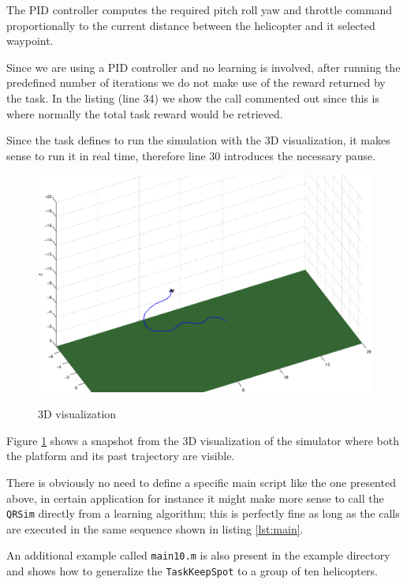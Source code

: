 \documentclass[a4paper,11pt]{report}
\newcommand{\snamettt}{\texttt{QRSim}\xspace}
\begin{document}
The PID controller computes the required pitch roll yaw and throttle command proportionally to the current distance between the helicopter and it selected waypoint.

Since we are using a PID controller and no learning is involved, after running the predefined number of iterations we do not make use of the reward returned by the task. In the listing (line 34) we show the call commented out since this is where normally the total task reward would be retrieved.

Since the task defines to run the simulation with the 3D visualization, it makes sense to run it in real time, therefore line 30 introduces the necessary pause.  

\begin{figure}
\begin{center}
\label{fig:3d}
\includegraphics[width=13cm]{./3d.eps}
 \caption{3D visualization}
\end{center}
\end{figure}

Figure \ref{fig:3d} shows a snapshot from the 3D visualization of the simulator where both the platform and its past trajectory are visible.

There is obviously no need to define a specific main script like the one presented above, in certain application for instance it might make more sense to call the \snamettt directly from  a learning algorithm; this is perfectly fine as long as the calls are executed in the same sequence shown in listing \ref{lst:main}.

An additional example called \texttt{main10.m} is also present in the example directory and shows how to generalize the \texttt{TaskKeepSpot} to a group of ten helicopters.
\end{document}

